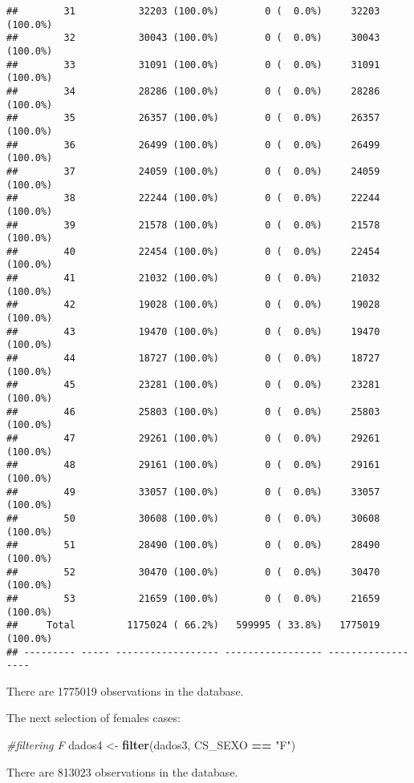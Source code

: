 \documentclass[
]{article}
\newenvironment{Shaded}{\begin{snugshade}}{\end{snugshade}}
\newcommand{\CommentTok}[1]{\textcolor[rgb]{0.56,0.35,0.01}{\textit{#1}}}
\newcommand{\KeywordTok}[1]{\textcolor[rgb]{0.13,0.29,0.53}{\textbf{#1}}}
\newcommand{\NormalTok}[1]{#1}
\newcommand{\OperatorTok}[1]{\textcolor[rgb]{0.81,0.36,0.00}{\textbf{#1}}}
\newcommand{\StringTok}[1]{\textcolor[rgb]{0.31,0.60,0.02}{#1}}
\begin{document}
\begin{verbatim}
##        31           32203 (100.0%)        0 (  0.0%)     32203 (100.0%)
##        32           30043 (100.0%)        0 (  0.0%)     30043 (100.0%)
##        33           31091 (100.0%)        0 (  0.0%)     31091 (100.0%)
##        34           28286 (100.0%)        0 (  0.0%)     28286 (100.0%)
##        35           26357 (100.0%)        0 (  0.0%)     26357 (100.0%)
##        36           26499 (100.0%)        0 (  0.0%)     26499 (100.0%)
##        37           24059 (100.0%)        0 (  0.0%)     24059 (100.0%)
##        38           22244 (100.0%)        0 (  0.0%)     22244 (100.0%)
##        39           21578 (100.0%)        0 (  0.0%)     21578 (100.0%)
##        40           22454 (100.0%)        0 (  0.0%)     22454 (100.0%)
##        41           21032 (100.0%)        0 (  0.0%)     21032 (100.0%)
##        42           19028 (100.0%)        0 (  0.0%)     19028 (100.0%)
##        43           19470 (100.0%)        0 (  0.0%)     19470 (100.0%)
##        44           18727 (100.0%)        0 (  0.0%)     18727 (100.0%)
##        45           23281 (100.0%)        0 (  0.0%)     23281 (100.0%)
##        46           25803 (100.0%)        0 (  0.0%)     25803 (100.0%)
##        47           29261 (100.0%)        0 (  0.0%)     29261 (100.0%)
##        48           29161 (100.0%)        0 (  0.0%)     29161 (100.0%)
##        49           33057 (100.0%)        0 (  0.0%)     33057 (100.0%)
##        50           30608 (100.0%)        0 (  0.0%)     30608 (100.0%)
##        51           28490 (100.0%)        0 (  0.0%)     28490 (100.0%)
##        52           30470 (100.0%)        0 (  0.0%)     30470 (100.0%)
##        53           21659 (100.0%)        0 (  0.0%)     21659 (100.0%)
##     Total         1175024 ( 66.2%)   599995 ( 33.8%)   1775019 (100.0%)
## --------- ----- ------------------ ----------------- ------------------
\end{verbatim}

There are 1775019 observations in the database.

The next selection of females cases:

\begin{Shaded}
\begin{Highlighting}[]
\CommentTok{#filtering F}
\NormalTok{dados4 <-}\StringTok{ }\KeywordTok{filter}\NormalTok{(dados3, CS_SEXO }\OperatorTok{==}\StringTok{ "F"}\NormalTok{)}
\end{Highlighting}
\end{Shaded}

There are 813023 observations in the database.
\end{document}
